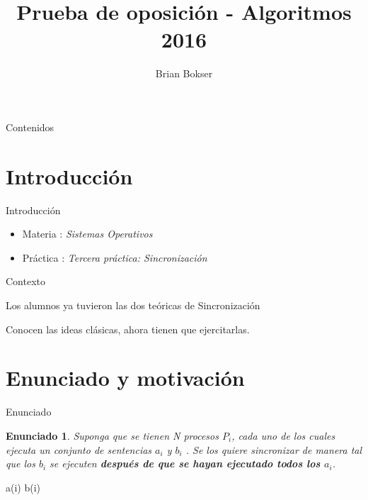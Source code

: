 \documentclass[pdf]{beamer}
\title[Prueba de oposición] %
{Prueba de oposición - Algoritmos 2016}
\author[Brian Bokser] %
{Brian Bokser}
\institute[UBA-FCEN] %
{
  Facultad de Ciencias Exactas y Naturales\\
  Universidad de Buenos Aires
}
\newtheorem{enun}{Enunciado}
\begin{document}
\begin{frame}
  \titlepage
\end{frame}

\begin{frame}{Contenidos}
  \tableofcontents
\end{frame}



\section{Introducci\'on}

\begin{frame}{Introducci\'on}
    \begin{itemize}
	\item Materia :  \emph{Sistemas Operativos}
	\vspace{2em}
	\item Práctica : \emph{Tercera práctica: Sincronización}

    \end{itemize}

\end{frame}

\begin{frame}{Contexto}
    \par{Los alumnos ya tuvieron las dos teóricas de Sincronización }
    \vspace{2em}
	
    \par{Conocen las ideas clásicas, ahora tienen que ejercitarlas.}
    \vspace{2em}
	
\end{frame}

\section{Enunciado y motivación}

\begin{frame}{Enunciado}

\begin{enun}
    Suponga que se tienen N procesos $P_i$, cada uno de los cuales ejecuta un conjunto de sentencias $a_i$
y $b_i$ . Se los quiere sincronizar de manera tal que los $b_i$ se ejecuten \textbf{después de que se hayan ejecutado
todos los $a_i$}.

\end{enun}

\pause

\begin{algorithmic}

     
        \State a(i)
        \vspace{1em}
        \State b(i)
        \vspace{1em}
        
    \EndFunction
\end{algorithmic}
    

\end{frame}
\end{document}
